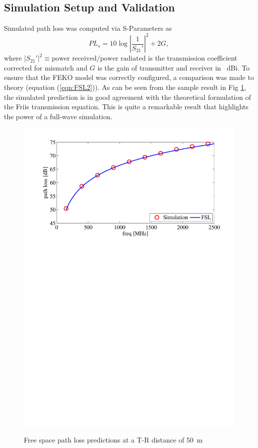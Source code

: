 \documentclass[10pt,journal,twoside]{IEEEtran}
\begin{document}
\subsection{Simulation Setup and Validation}
Simulated path loss was computed via S-Parameters as
\begin{equation}
PL_s = 10\log \left|\dfrac{1}{ S_{21}{'}}\right|^2 + 2G,
\end{equation}
where $\left|S_{21}{'}\right|^2 \equiv \text{power received}/\text{power radiated}$ is the transmission coefficient corrected for mismatch and $G$ is the gain of transmitter and receiver in \SI{}{dBi}. To ensure that the FEKO model was correctly configured, a comparison was made to theory (equation (\ref{eqn:FSL2})). As can be seen from the sample result in Fig \ref{fig:sim_fsl}, the simulated prediction is in good agreement with the theoretical formulation of the Friis transmission equation. This is quite a remarkable result that highlights the power of a full-wave simulation. %
\begin{figure}
	\centering
	{\includegraphics[width=\linewidth]{path_loss_verification_50m}}
	\caption{Free space path loss predictions at a T-R distance of \SI{50}{m}}
	\label{fig:sim_fsl}
\end{figure} 
%
\end{document}
